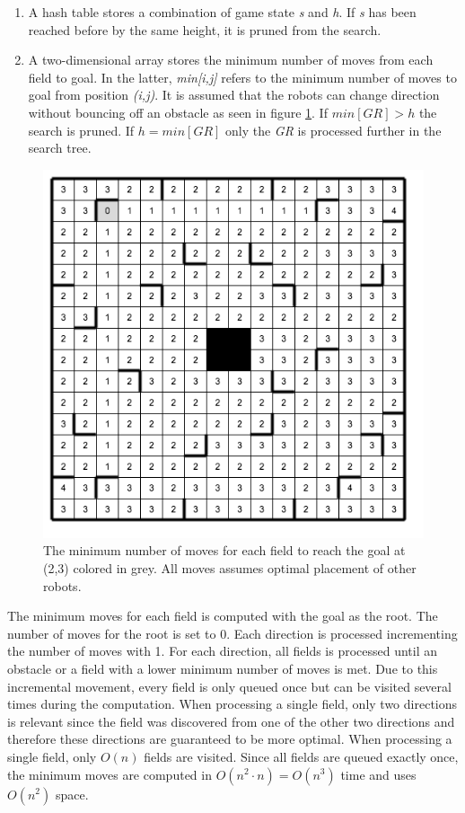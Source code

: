 \documentclass[]{article}
\providecommand{\tightlist}{%
  \setlength{\itemsep}{0pt}\setlength{\parskip}{0pt}}
\begin{document}
\begin{enumerate}
\def\labelenumi{\arabic{enumi}.}
\tightlist
\item
  A hash table stores a combination of game state \emph{s} and \emph{h}.
  If \emph{s} has been reached before by the same height, it is pruned
  from the search.
\item
  A two-dimensional array stores the minimum number of moves from each
  field to goal. In the latter, \emph{min{[}i,j{]}} refers to the
  minimum number of moves to goal from position \emph{(i,j)}. It is
  assumed that the robots can change direction without bouncing off an
  obstacle as seen in figure \ref{fig:minmoves}. If \(min[GR] > h\) the
  search is pruned. If \(h = min[GR]\) only the \emph{GR} is processed
  further in the search tree.
\end{enumerate}

\begin{figure}[htb]
\centering
\includegraphics[width=0.6\linewidth]{img/min_moves.png}
\caption{The minimum number of moves for each field to reach the goal at (2,3) colored in grey. All moves assumes optimal placement of other robots.}
\label{fig:minmoves}
\end{figure}

The minimum moves for each field is computed with the goal as the root.
The number of moves for the root is set to 0. Each direction is
processed incrementing the number of moves with 1. For each direction,
all fields is processed until an obstacle or a field with a lower
minimum number of moves is met. Due to this incremental movement, every
field is only queued once but can be visited several times during the
computation. When processing a single field, only two directions is
relevant since the field was discovered from one of the other two
directions and therefore these directions are guaranteed to be more
optimal. When processing a single field, only \(O(n)\) fields are
visited. Since all fields are queued exactly once, the minimum moves are
computed in \(O(n^2 \cdot n) = O(n^3)\) time and uses \(O(n^2)\) space.
\end{document}
